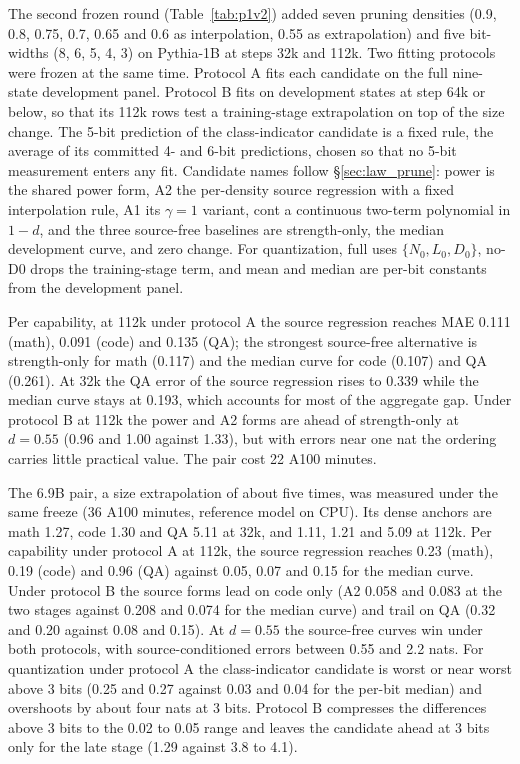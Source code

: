 The second frozen round (Table~\ref{tab:p1v2}) added seven pruning
densities (0.9, 0.8, 0.75, 0.7, 0.65 and 0.6 as interpolation, 0.55 as
extrapolation) and five bit-widths (8, 6, 5, 4, 3) on Pythia-1B at
steps 32k and 112k. Two fitting protocols were frozen at the same time.
Protocol A fits each candidate on the full nine-state development
panel. Protocol B fits on development states at step 64k or below, so
that its 112k rows test a training-stage extrapolation on top of the
size change. The 5-bit prediction of the class-indicator candidate is a
fixed rule, the average of its committed 4- and 6-bit predictions,
chosen so that no 5-bit measurement enters any fit. Candidate names
follow \S\ref{sec:law_prune}: power is the shared power form, A2 the
per-density source regression with a fixed interpolation rule, A1 its
$\gamma=1$ variant, cont a continuous two-term polynomial in $1-d$, and
the three source-free baselines are strength-only, the median
development curve, and zero change. For quantization, full uses
$\{N_0, L_0, D_0\}$, no-D0 drops the training-stage term, and mean and
median are per-bit constants from the development panel.

Per capability, at 112k under protocol A the source regression reaches
MAE 0.111 (math), 0.091 (code) and 0.135 (QA); the strongest
source-free alternative is strength-only for math (0.117) and the
median curve for code (0.107) and QA (0.261). At 32k the QA error of
the source regression rises to 0.339 while the median curve stays at
0.193, which accounts for most of the aggregate gap. Under protocol B at
112k the power and A2 forms are ahead of strength-only at $d=0.55$
(0.96 and 1.00 against 1.33), but with errors near one nat the ordering
carries little practical value. The pair cost 22 A100 minutes.

The 6.9B pair, a size extrapolation of about five times, was measured
under the same freeze (36 A100 minutes, reference model on CPU). Its
dense anchors are math 1.27, code 1.30 and QA 5.11 at 32k, and 1.11,
1.21 and 5.09 at 112k. Per capability under protocol A at 112k, the
source regression reaches 0.23 (math), 0.19 (code) and 0.96 (QA)
against 0.05, 0.07 and 0.15 for the median curve. Under protocol B the
source forms lead on code only (A2 0.058 and 0.083 at the two stages
against 0.208 and 0.074 for the median curve) and trail on QA (0.32 and
0.20 against 0.08 and 0.15). At $d=0.55$ the source-free curves win
under both protocols, with source-conditioned errors between 0.55 and
2.2 nats. For quantization under protocol A the class-indicator
candidate is worst or near worst above 3 bits (0.25 and 0.27 against
0.03 and 0.04 for the per-bit median) and overshoots by about four nats
at 3 bits. Protocol B compresses the differences above 3 bits to the
0.02 to 0.05 range and leaves the candidate ahead at 3 bits only for the
late stage (1.29 against 3.8 to 4.1).




